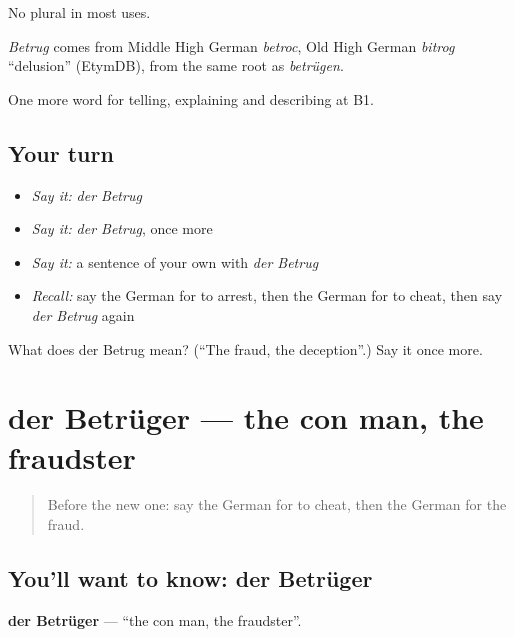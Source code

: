 No plural in most uses.

\begin{cousinweb}
\emph{Betrug} comes from Middle High German \emph{betroc}, Old High German \emph{bitrog} \textquotedblleft{}delusion\textquotedblright{} (EtymDB), from the same root as \emph{betrügen}.
\end{cousinweb}

\begin{grammarlens}[title={What you've built}]
One more word for telling, explaining and describing at B1.
\end{grammarlens}

\subsection*{Your turn}
\begin{itemize}
\raggedright
  \item \emph{Say it:} \emph{der Betrug}
  \item \emph{Say it:} \emph{der Betrug}, once more
  \item \emph{Say it:} a sentence of your own with \emph{der Betrug}
  \item \emph{Recall:} say the German for to arrest, then the German for to cheat, then say \emph{der Betrug} again
\end{itemize}

\begin{tcolorbox}[breakable,colback=teal!4,colframe=teal!35!black,title={Before you move on}]
What does der Betrug mean? (\textquotedblleft{}The fraud, the deception\textquotedblright{}.) Say it once more.
\end{tcolorbox}
\section[der Betrüger]{der Betrüger — the con man, the fraudster}

\label{lesson:GE-C285-betrueger}



\begin{quote}
Before the new one: say the German for to cheat, then the German for the fraud.
\end{quote}

\subsection*{You'll want to know: der Betrüger}
\textbf{der Betrüger} — \textquotedblleft{}the con man, the fraudster\textquotedblright{}.

